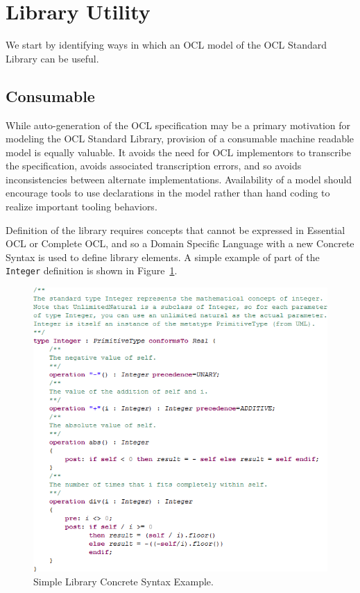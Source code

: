 \documentclass{eceasst}
\begin{document}
\section{Library Utility}\label{LibraryUtility}

We start by identifying ways in which an OCL model of the OCL Standard Library can be useful.
 
\subsection{Consumable}

While auto-generation of the OCL specification may be a primary motivation for modeling the OCL Standard Library, provision of a consumable machine readable model is equally valuable. It avoids the need for OCL implementors to transcribe the specification, avoids associated transcription errors, and so avoids inconsistencies between alternate implementations. Availability of a model should encourage tools to use declarations in the model rather than hand coding to realize important tooling behaviors.

Definition of the library requires concepts that cannot be expressed in Essential OCL or Complete OCL, and so a Domain Specific Language with a new Concrete Syntax is used to define library elements. A simple example of part of the \verb|Integer| definition is shown in Figure~\ref{fig:SimpleExample}.

\begin{figure}
  \begin{center}
    \includegraphics[width=5.75in]{SimpleExample.png}
  \end{center}
  \caption{Simple Library Concrete Syntax Example.}
  \label{fig:SimpleExample}
\end{figure}
\end{document}
